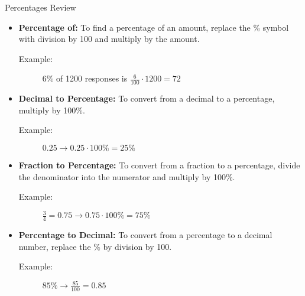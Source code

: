 \documentclass{beamer}
\begin{document}
\begin{frame}
\begin{block}{Percentages Review}
\begin{itemize}
\item \textbf{Percentage of:} To find a percentage of an amount, replace the \% symbol with division by 100 and multiply by the amount.
\begin{description}
\item[Example:] 6\% of 1200 responses is $\frac{6}{100}\cdot 1200=72$
\end{description}
\item \textbf{Decimal to Percentage:} To convert from a decimal to a percentage, multiply by 100\%.
\begin{description}
\item[Example:] $0.25\rightarrow 0.25\cdot100\%=25\%$
\end{description}
\item \textbf{Fraction to Percentage:} To convert from a fraction to a percentage, divide the denominator into the numerator and multiply by 100\%.
\begin{description}
\item[Example:] $\frac{3}{4}=0.75\rightarrow 0.75\cdot 100\%=75\%$
\end{description}
\item \textbf{Percentage to Decimal:} To convert from a percentage to a decimal number, replace the \% by division by 100. 
\begin{description}
\item[Example:] $85\%\rightarrow \frac{85}{100}=0.85$
\end{description}
\end{itemize}
\end{block}
\end{frame}
\end{document}
